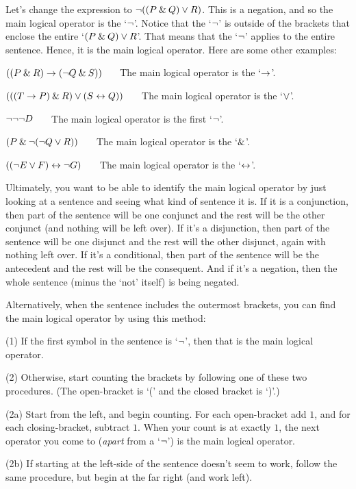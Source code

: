 Let's change the expression to ${\neg}((P \mathbin{\&} Q) \vee R)$. This is a negation, and so the main logical operator is the `${\neg}$'. Notice that the `${\neg}$' is outside of the brackets that enclose the entire `$(P \mathbin{\&} Q) \vee R$'. That means that the `${\neg}$' applies to the entire sentence. Hence, it is the main logical operator. 
Here are some other examples:
\begin{earg}
\item[\ex{logic-operator1}] $((P \mathbin{\&} R) \rightarrow ({\neg} Q \mathbin{\&} S))$ ~~~The main logical operator is the `$\rightarrow$'. 
\item[\ex{logic-operator2}] $(((T \rightarrow P) \mathbin{\&} R) \vee (S \leftrightarrow Q))$ ~~~The main logical operator is the `$\vee$'.
\item[\ex{logic-operator3}] ${\neg}{\neg}{\neg} D$ ~~~The main logical operator is the first `${\neg}$'.
\item[\ex{logic-operator4}] $(P \mathbin{\&} {\neg} ({\neg} Q \vee R))$ ~~~The main logical operator is the `$\mathbin{\&}$'. 
\item[\ex{logic-operator5}] $(({\neg} E \vee F) \leftrightarrow {\neg} G)$ ~~~The main logical operator is the `$\leftrightarrow$'.
\end{earg}

Ultimately, you want to be able to identify the main logical operator by just looking at a sentence and seeing what kind of sentence it is. If it is a conjunction, then part of the sentence will be one conjunct and the rest will be the other conjunct (and nothing will be left over). If it's a disjunction, then part of the sentence will be one disjunct and the rest will the other disjunct, again with nothing left over. If it's a conditional, then part of the sentence will be the antecedent and the rest will be the consequent. And if it's a negation, then the whole sentence (minus the `not' itself) is being negated.

Alternatively, when the sentence includes the outermost brackets, you can find the main logical operator by using this method:
\begin{ebullet}
	\item[(1)] If the first symbol in the sentence is `${\neg}$', then that is the main logical operator.
	\item[(2)] Otherwise, start counting the brackets by following one of these two procedures. (The open-bracket is `(' and the closed bracket is `)'.) 
	\begin{earg}
	\item[(2a)] Start from the left, and begin counting. For each open-bracket add $1$, and for each closing-bracket, subtract $1$. When your count is at exactly $1$, the next operator you come to (\emph{apart} from a `${\neg}$') is the main logical operator. 
	\item[(2b)] If starting at the left-side of the sentence doesn't seem to work, follow the same procedure, but begin at the far right (and work left). %
	\end{earg}
\end{ebullet}

